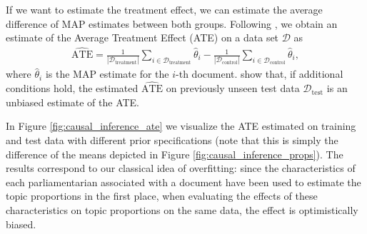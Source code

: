 If we want to estimate the treatment effect, we can estimate the average difference of MAP estimates between both groups. Following \cite{egami2018make}, we obtain an estimate of the Average Treatment Effect (ATE) on a data set $\mathcal{D}$ as 
\begin{align}
\widehat{\text{ATE}} = \frac{1}{|\mathcal{D}_{\text{treatment}}|}\sum_{i \in \mathcal{D}_{\text{treatment}}} \hat{\theta}_i - \frac{1}{|\mathcal{D}_{\text{control}}|}\sum_{i \in \mathcal{D}_{\text{control}}} \hat{\theta}_i,
\end{align} 
where $\hat{\theta}_i$ is the MAP estimate for the $i$-th document. \cite{egami2018make} show that, if additional conditions hold, the estimated $\widehat{\text{ATE}}$ on previously unseen test data $\mathcal{D}_{\text{test}}$ is an unbiased estimate of the ATE.

In Figure \ref{fig:causal_inference_ate} we visualize the ATE estimated on training and test data with different prior specifications (note that this is simply the difference of the means depicted in Figure \ref{fig:causal_inference_props}). The results correspond to our classical idea of overfitting: since the characteristics of each parliamentarian associated with a document have been used to estimate the topic proportions in the first place, when evaluating the effects of these characteristics on topic proportions on the same data, the effect is optimistically biased.

